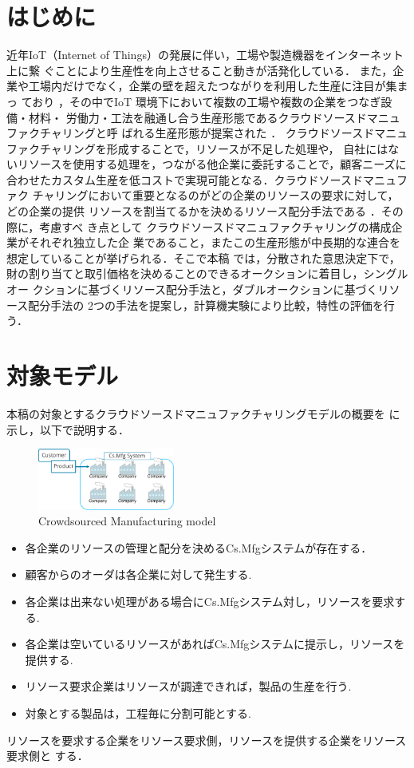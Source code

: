 \documentclass{ujarticle}
\begin{document}
\maketitle

\section{はじめに}
近年IoT（Internet of Things）の発展に伴い，工場や製造機器をインターネット上に繋
ぐことにより生産性を向上させること動きが活発化している．
また，企業や工場内だけでなく，企業の壁を超えたつながりを利用した生産に注目が集まっ
ており \cite{IVI}，その中でIoT 環境下において複数の工場や複数の企業をつなぎ設備・材料・
労働力・工法を融通し合う生産形態であるクラウドソースドマニュファクチャリングと呼
ばれる生産形態が提案された \cite{IEC}．
クラウドソースドマニュファクチャリングを形成することで，リソースが不足した処理や，
自社にはないリソースを使用する処理を，つながる他企業に委託することで，顧客ニーズに
合わせたカスタム生産を低コストで実現可能となる．\cite{勝村}クラウドソースドマニュファク
チャリングにおいて重要となるのがどの企業のリソースの要求に対して，どの企業の提供
リソースを割当てるかを決めるリソース配分手法である \cite{Wu}．その際に，考慮すべ
き点として
クラウドソースドマニュファクチャリングの構成企業がそれぞれ独立した企
業であること，またこの生産形態が中長期的な連合を想定していることが挙げられる．そこで本稿
では，分散された意思決定下で，財の割り当てと取引価格を決めることのできるオークションに着目し，シングルオー
クションに基づくリソース配分手法と，ダブルオークションに基づくリソース配分手法の
2つの手法を提案し，計算機実験により比較，特性の評価を行う．
\section{対象モデル}
本稿の対象とするクラウドソースドマニュファクチャリングモデルの概要を
に示し，以下で説明する．
\begin{figure}[H]
  \centering
  \includegraphics[width=0.4\textwidth]{CsMfg.pdf} 
  \caption{Crowdsourced Manufacturing model}
  \label{fig:CsMfg}
\end{figure}
\begin{itemize}
  \item {各企業のリソースの管理と配分を決めるCs.Mfgシステムが存在する．}
  \item {顧客からのオーダは各企業に対して発生する.}
  \item {各企業は出来ない処理がある場合にCs.Mfgシステム対し，リソースを要求する.} 
  \item {各企業は空いているリソースがあればCs.Mfgシステムに提示し，リソースを提供する.}
  \item {リソース要求企業はリソースが調達できれば，製品の生産を行う.}
  \item {対象とする製品は，工程毎に分割可能とする.}
\end{itemize}
リソースを要求する企業をリソース要求側，リソースを提供する企業をリソース要求側と
する．
\end{document}
